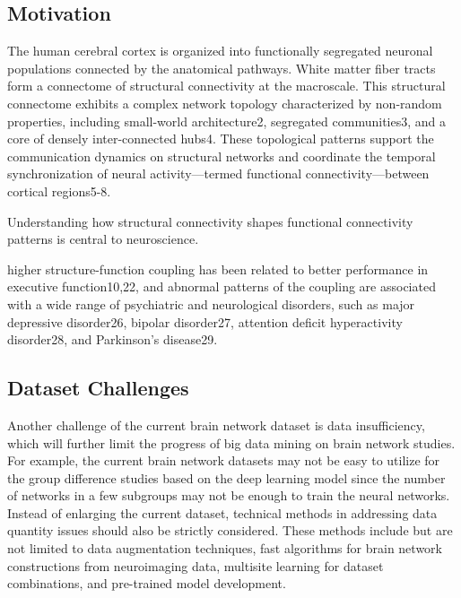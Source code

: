 
\subsection{Motivation}
The human cerebral cortex is organized into functionally segregated 
neuronal populations connected by the anatomical pathways. 
White matter fiber tracts form a connectome of structural 
connectivity at the macroscale. This structural connectome exhibits 
a complex network topology characterized by non-random properties, 
including small-world architecture2, segregated 
communities3, and a core of densely inter-connected hubs4. 
These topological patterns support the communication dynamics on 
structural networks and coordinate the temporal synchronization of 
neural activity—termed functional connectivity—between cortical regions5-8.

Understanding how structural connectivity shapes functional connectivity 
patterns is central to neuroscience. 

higher structure-function coupling has been related to better performance 
in executive function10,22, and abnormal patterns of the
coupling are associated with a wide range of psychiatric and 
neurological disorders, such as major depressive disorder26, 
bipolar disorder27, attention deficit hyperactivity disorder28, 
and Parkinson’s disease29.

\cite{Chen2024}


\subsection{ Dataset Challenges}
Another challenge of the current brain network
dataset is data insufficiency, which will further 
limit the progress of big data mining on brain network studies. 
For example, the current brain network datasets may not be easy 
to utilize for the group difference studies based on the deep 
learning model since the number of networks in a few subgroups 
may not be enough to train the neural networks.
Instead of enlarging the current dataset, technical methods 
in addressing data quantity issues should also be strictly 
considered. These methods include but are not limited to 
data augmentation techniques, fast algorithms for brain 
network constructions from neuroimaging data, multisite 
learning for dataset combinations, and pre-trained model
development. \cite{Tang2023}